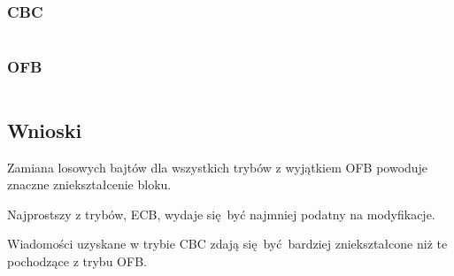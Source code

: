 \documentclass[12pt]{article}
\newenvironment*{dummyenv}{}{}
\begin{document}
\subsubsection{CBC}

\begin{dummyenv}
	\inputminted[breaklines,firstline=1,lastline=51]{yaml}{2-mangled-cbc.txt}
\end{dummyenv}

\subsubsection{OFB}

\begin{dummyenv}
	\inputminted[breaklines,firstline=1,lastline=51]{yaml}{2-mangled-ofb.txt}
\end{dummyenv}

\subsection{Wnioski}

Zamiana losowych bajtów dla wszystkich trybów z wyjątkiem OFB powoduje
znaczne zniekształcenie bloku.

Najprostszy z trybów, ECB, wydaje się być najmniej podatny na modyfikacje.

Wiadomości uzyskane w trybie CBC zdają się być bardziej zniekształcone niż te
pochodzące z trybu OFB.
\end{document}
